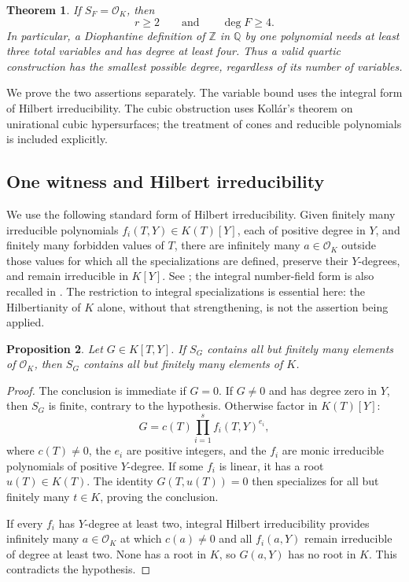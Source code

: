 \documentclass[11pt]{article}
\newtheorem{theorem}{Theorem}[section]
\newtheorem{proposition}[theorem]{Proposition}
\theoremstyle{definition}
\begin{document}
\begin{theorem}\label{thm:lower-bounds}
If $S_F=\mathcal O_K$, then
\[
                    r\geq 2\qquad\text{and}\qquad\deg F\geq 4.
\]
In particular, a Diophantine definition of $\mathbb Z$ in $\mathbb Q$
by one polynomial needs at least three total variables and has degree at least
four.  Thus a valid quartic construction has the smallest possible degree,
regardless of its number of variables.
\end{theorem}

We prove the two assertions separately.  The variable bound uses the integral
form of Hilbert irreducibility.  The cubic obstruction uses Koll\'ar's theorem
on unirational cubic hypersurfaces; the treatment of cones and reducible
polynomials is included explicitly.

\subsection{One witness and Hilbert irreducibility}

We use the following standard form of Hilbert irreducibility.  Given finitely
many irreducible polynomials $f_i(T,Y)\in K(T)[Y]$, each of positive degree in
$Y$, and finitely many forbidden values of $T$, there are infinitely many
$a\in\mathcal O_K$ outside those values for which all the specializations are
defined, preserve their $Y$-degrees, and remain irreducible in $K[Y]$.
See \cite[Chapter~4, Section~4]{lbSchinzel2000}; the integral number-field
form is also recalled in \cite[Introduction]{lbMuller2001}.
The restriction to integral specializations is essential here: the
Hilbertianity of $K$ alone, without that strengthening, is not the assertion
being applied.

\begin{proposition}\label{prop:one-witness}
Let $G\in K[T,Y]$.  If $S_G$ contains all but finitely many elements of
$\mathcal O_K$, then $S_G$ contains all but finitely many elements of $K$.
\end{proposition}
\begin{proof}
The conclusion is immediate if $G=0$.  If $G\neq0$ and has degree zero in
$Y$, then $S_G$ is finite, contrary to the hypothesis.  Otherwise factor in
$K(T)[Y]$:
\[
                G=c(T)\prod_{i=1}^{s}f_i(T,Y)^{e_i},
\]
where $c(T)\neq0$, the $e_i$ are positive integers, and the $f_i$ are monic
irreducible polynomials of positive $Y$-degree.
If some $f_i$ is linear, it has a root $u(T)\in K(T)$.  The identity
$G(T,u(T))=0$ then specializes for all but finitely many $t\in K$,
proving the conclusion.

If every $f_i$ has $Y$-degree at least two, integral Hilbert irreducibility
provides infinitely many $a\in\mathcal O_K$ at which $c(a)\neq0$ and all
$f_i(a,Y)$ remain irreducible of degree at least two.  None has a root in
$K$, so $G(a,Y)$ has no root in $K$.  This contradicts the hypothesis.
\end{proof}
\end{document}
